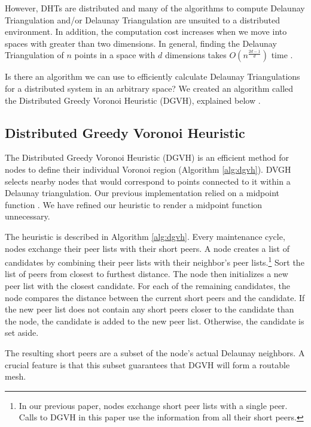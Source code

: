 \documentclass[11pt,conference]{IEEEtran}
\begin{document}
However, DHTs are distributed and many of the algorithms to compute Delaunay Triangulation and/or Delaunay Triangulation are unsuited to a distributed environment.
In addition, the computation cost increases when we move into spaces with greater than two dimensions.
In general, finding the Delaunay Triangulation of $n$ points in a space with $d$ dimensions takes $O(n^{\frac{2d-1}{d}})$ time \cite{watson1981computing}.


Is there an algorithm we can use to efficiently calculate Delaunay Triangulations for a distributed system in an arbitrary space?
We created an algorithm called the Distributed Greedy Voronoi Heuristic (DGVH), explained below \cite{dgvh}.


\subsection{Distributed Greedy Voronoi Heuristic}
\label{sec:dgvh}


The Distributed Greedy Voronoi Heuristic (DGVH) is an efficient method for nodes to define their individual Voronoi region (Algorithm \ref{alg:dgvh}). 
DVGH selects nearby nodes that would correspond to points connected to it within a Delaunay triangulation.
Our previous implementation relied on a midpoint function \cite{dgvh}.
We have refined our heuristic to render a midpoint function unnecessary.

The heuristic is described in Algorithm \ref{alg:dgvh}.
Every maintenance cycle, nodes exchange their peer lists with their short peers.
A node creates a list of candidates by combining their peer lists with their neighbor's peer lists.\footnote{In our previous paper, nodes exchange short peer lists with a single peer. Calls to DGVH in this paper use the information from all their short peers.}
Sort the list of peers from closest to furthest distance.
The node then initializes a new peer list with the closest candidate.
For each of the remaining candidates, the node compares the distance between the current short peers and the candidate.
If the new peer list does not contain any short  peers closer to the candidate than the node, the candidate is added to the new peer list.
Otherwise, the candidate is set aside.

The resulting short peers are a subset of the node's actual Delaunay neighbors.
A crucial feature is that this subset guarantees that DGVH will form a routable mesh.
\end{document}

